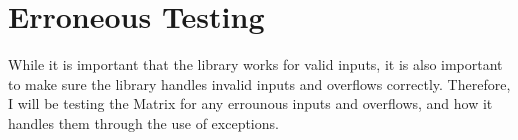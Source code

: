 \section{Erroneous Testing}
While it is important that the library works for valid inputs, it is also important to make sure the library handles invalid inputs and overflows correctly. Therefore, I will be testing the Matrix for any errounous inputs and overflows, and how it handles them through the use of exceptions.


